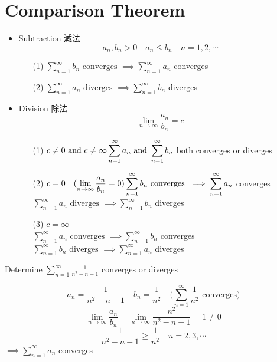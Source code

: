 \section{Comparison Theorem}
\begin{theorem}
\begin{itemize}
\item Subtraction 減法\\
\[a_n, b_n > 0 \quad a_n \leq b_n \quad n = 1, 2, \cdots\]
\begin{itemize}
\item[(1)] \(\displaystyle \sum^{\infty}_{n = 1} b_n \text{ converges } \implies \sum^{\infty}_{n = 1} a_n\) converges
\item[(2)] \(\displaystyle \sum^{\infty}_{n =1} a_n \text{ diverges } \implies \sum^{\infty}_{n = 1} b_n\) diverges 
\end{itemize}
\item Division 除法\\
\[\displaystyle \lim_{n \to \infty} \frac{a_n}{b_n} = c\]
\begin{itemize}
\item[(1)] \(c \neq 0 \text{ and } c \neq \infty\\
\displaystyle \sum^{\infty}_{n = 1} a_n \text{ and } \sum^{\infty}_{n = 1} b_n\) both converges or diverges
\item[(2)] \(c = 0 \quad (\displaystyle \lim_{n \to \infty} \frac{a_n}{b_n} = 0)\\
\displaystyle \sum^{\infty}_{n = 1} b_n \text{ converges } \implies \sum^{\infty}_{n = 1} a_n\) converges\\
\(\displaystyle \sum^{\infty}_{n = 1} a_n \text{ diverges } \implies \sum^{\infty}_{n = 1} b_n\) diverges 
\item[(3)] \(c = \infty\)\\
\(\displaystyle \sum^{\infty}_{n = 1} a_n \text{ converges } \implies \sum^{\infty}_{n = 1} b_n\) converges\\
\(\displaystyle \sum^{\infty}_{n = 1} b_n \text{ diverges } \implies \sum^{\infty}_{n = 1} a_n\) diverges \\
\end{itemize}
\end{itemize}
\end{theorem}
\begin{eg}
Determine \(\displaystyle \sum^{\infty}_{n = 1} \frac{1}{n^2 - n - 1}\) converges or diverges

\soln
\[\displaystyle a_n = \frac{1}{n^2 - n - 1} \quad b_n = \frac{1}{n^2} \quad (\sum^{\infty}_{n = 1} \frac{1}{n^2} \text{ converges)}\]
\[\displaystyle \lim_{n \to \infty} \frac{a_n}{b_n} = \lim_{n \to \infty} \frac{n^2}{n^2 - n - 1} = 1 \neq 0\]
\[\displaystyle \frac{1}{n^2 - n - 1} \geq \frac{1}{n^2} \quad n = 2, 3, \cdots\]
\(\implies \displaystyle \sum^{\infty}_{n = 1} a_n\) converges
\end{eg}
